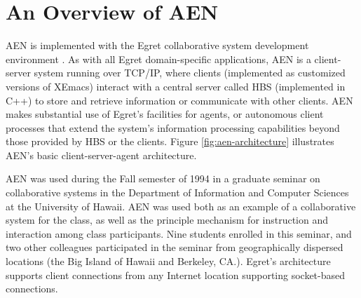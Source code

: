 
\section{An Overview of AEN}

AEN is implemented with the Egret collaborative system development
environment \cite{csdl-www-egret,csdl-93-09}.  As with all Egret
domain-specific applications, AEN is a client-server system running over
TCP/IP, where clients (implemented as customized versions of
XEmacs) interact with a central server called HBS (implemented in C++) to
store and retrieve information or communicate with other
clients.  AEN makes substantial use of Egret's facilities for agents,
or autonomous client processes that extend the system's information
processing capabilities beyond those provided by HBS or the clients.  Figure
\ref{fig:aen-architecture} illustrates AEN's basic client-server-agent
architecture.


\begin{figure*}[htb]
 \centerline{}
 \caption{ AEN's architecture from an OS process perspective. AEN consists
of a central server called HBS that provides basic storage and concurrency
control mechanisms, augmented with several agent processes to support
strong collaboration.  AEN was used with anywhere between one and twelve simultaneous
user-level client connections during Fall, 1994.}
\label{fig:aen-architecture}
\end{figure*}


AEN was used during the Fall semester of 1994 in a graduate seminar on
collaborative systems in the Department of Information and Computer Sciences
at the University of Hawaii.  AEN was used both as an example of a
collaborative system for the class, as well as the principle mechanism for
instruction and interaction among class participants.  Nine students enrolled
in this seminar, and two other colleagues participated in the seminar from
geographically dispersed locations (the Big Island of Hawaii and Berkeley,
CA.).  Egret's architecture supports client connections from any Internet
location supporting socket-based connections.

